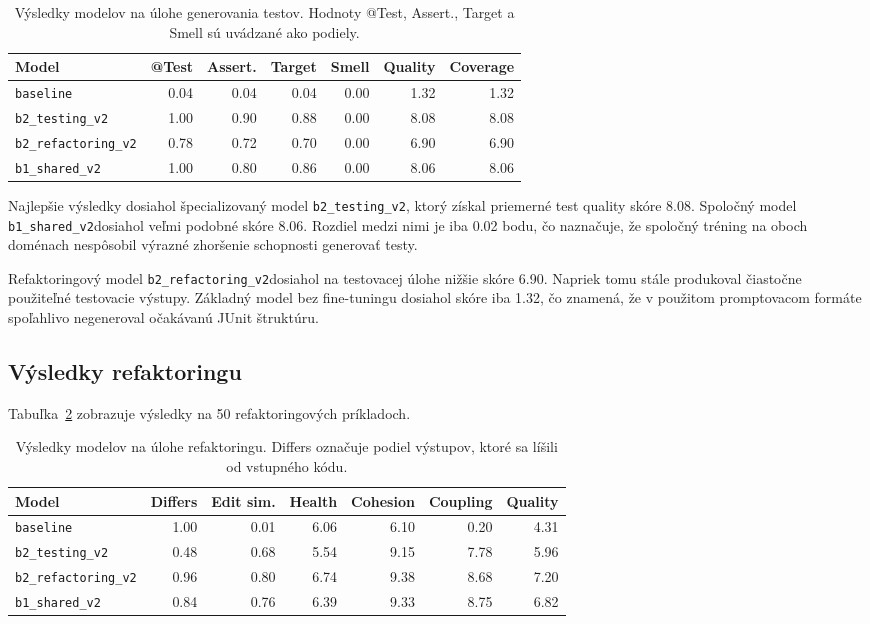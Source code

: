 \documentclass[11pt,a4paper]{article}
\newcommand{\modeltest}{\texttt{b2\_testing\_v2}}
\newcommand{\modelref}{\texttt{b2\_refactoring\_v2}}
\newcommand{\modelshared}{\texttt{b1\_shared\_v2}}
\begin{document}
\begin{table}[h]
\centering
\small
\begin{tabular}{lrrrrrr}
\toprule
Model & @Test & Assert. & Target & Smell & Quality & Coverage \\
\midrule
\texttt{baseline} & 0.04 & 0.04 & 0.04 & 0.00 & 1.32 & 1.32 \\
\modeltest & 1.00 & 0.90 & 0.88 & 0.00 & 8.08 & 8.08 \\
\modelref & 0.78 & 0.72 & 0.70 & 0.00 & 6.90 & 6.90 \\
\modelshared & 1.00 & 0.80 & 0.86 & 0.00 & 8.06 & 8.06 \\
\bottomrule
\end{tabular}
\caption{Výsledky modelov na úlohe generovania testov. Hodnoty @Test, Assert., Target a Smell sú uvádzané ako podiely.}
\label{tab:testing-results}
\end{table}

Najlepšie výsledky dosiahol špecializovaný model \modeltest, ktorý získal priemerné test quality skóre 8.08. Spoločný model \modelshared dosiahol veľmi podobné skóre 8.06. Rozdiel medzi nimi je iba 0.02 bodu, čo naznačuje, že spoločný tréning na oboch doménach nespôsobil výrazné zhoršenie schopnosti generovať testy.

Refaktoringový model \modelref dosiahol na testovacej úlohe nižšie skóre 6.90. Napriek tomu stále produkoval čiastočne použiteľné testovacie výstupy. Základný model bez fine-tuningu dosiahol skóre iba 1.32, čo znamená, že v použitom promptovacom formáte spoľahlivo negeneroval očakávanú JUnit štruktúru.

\subsection{Výsledky refaktoringu}

Tabuľka~\ref{tab:refactoring-results} zobrazuje výsledky na 50 refaktoringových príkladoch.

\begin{table}[h]
\centering
\small
\begin{tabular}{lrrrrrr}
\toprule
Model & Differs & Edit sim. & Health & Cohesion & Coupling & Quality \\
\midrule
\texttt{baseline} & 1.00 & 0.01 & 6.06 & 6.10 & 0.20 & 4.31 \\
\modeltest & 0.48 & 0.68 & 5.54 & 9.15 & 7.78 & 5.96 \\
\modelref & 0.96 & 0.80 & 6.74 & 9.38 & 8.68 & 7.20 \\
\modelshared & 0.84 & 0.76 & 6.39 & 9.33 & 8.75 & 6.82 \\
\bottomrule
\end{tabular}
\caption{Výsledky modelov na úlohe refaktoringu. Differs označuje podiel výstupov, ktoré sa líšili od vstupného kódu.}
\label{tab:refactoring-results}
\end{table}
\end{document}
